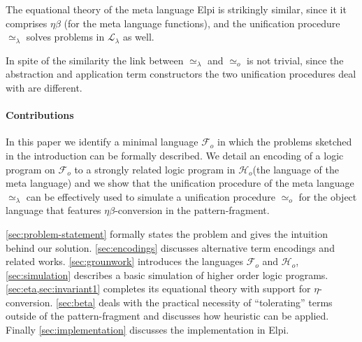 \documentclass[sigconf,natbib=false,review]{acmart}
\newcommand{\UnifRel}{\ensuremath{\simeq}}
\newcommand{\nUnifRel}{\ensuremath{\not\simeq}}
\newcommand{\Uo}{\ensuremath{\UnifRel_o}\xspace}
\newcommand{\Ue}{\ensuremath{\UnifRel_\lambda}\xspace}
\newcommand{\nUe}{\ensuremath{\nUnifRel_\lambda}\xspace}
\newcommand{\llambda}{\ensuremath{\mathcal{L}_\lambda}\xspace}
\newcommand{\Fo}{\ensuremath{\mathcal{F}_{\!o}\xspace}} %
\newcommand{\Ho}{\ensuremath{\mathcal{H}_o}\xspace}
\begin{document}
The equational theory of the meta language Elpi is strikingly similar,
since it it comprises $\eta\beta$ (for the meta language functions), and the
unification procedure \Ue{} solves problems in
\llambda as well.

In spite of the similarity the link between \Ue{} and \Uo{} is not trivial,
since the abstraction and application term constructors
the two unification procedures deal with are different.
%
\paragraph{Contributions}
In this paper we identify a minimal language \Fo{} in which the problems
sketched in the introduction can be formally described.
We detail an encoding of a logic program on \Fo{} to a strongly related
logic program in \Ho (the language of the meta language) and we show that
the unification procedure of the meta language \Ue{} can be effectively
used to simulate a unification procedure \Uo for the object language that
features $\eta\beta$-conversion in the pattern-fragment.

\cref{sec:problem-statement} formally states the problem and gives the
intuition behind our solution. \cref{sec:encodings} discusses alternative
term encodings and related works. \cref{sec:grounwork} introduces
the languages \Fo{} and \Ho{}, \cref{sec:simulation} describes a
basic simulation of higher order logic programs.
\cref{sec:eta,sec:invariant1} completes its equational theory
with support for $\eta$-conversion. \cref{sec:beta} deals with the
practical necessity of ``tolerating'' terms outside of the
pattern-fragment and discusses how heuristic can be applied.
Finally \cref{sec:implementation} discusses the implementation in Elpi.
\end{document}
